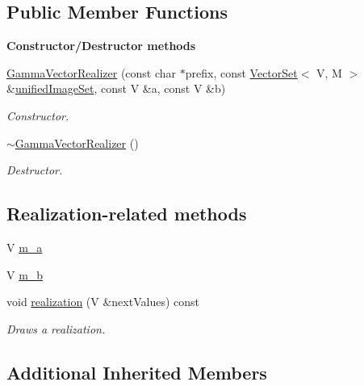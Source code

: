 \subsection*{Public Member Functions}
\begin{Indent}{\bf Constructor/\-Destructor methods}\par
\begin{DoxyCompactItemize}
\item 
\hyperlink{class_q_u_e_s_o_1_1_gamma_vector_realizer_ae6ec0099314ff9d89101c168abfcc9c3}{Gamma\-Vector\-Realizer} (const char $\ast$prefix, const \hyperlink{class_q_u_e_s_o_1_1_vector_set}{Vector\-Set}$<$ V, M $>$ \&\hyperlink{class_q_u_e_s_o_1_1_base_vector_realizer_ad958991bab8d6369e8a0d66b22a237d4}{unified\-Image\-Set}, const V \&a, const V \&b)
\begin{DoxyCompactList}\small\item\em Constructor. \end{DoxyCompactList}\item 
\hyperlink{class_q_u_e_s_o_1_1_gamma_vector_realizer_ac75db6b81ad76b17b1ffccfdd87594d2}{$\sim$\-Gamma\-Vector\-Realizer} ()
\begin{DoxyCompactList}\small\item\em Destructor. \end{DoxyCompactList}\end{DoxyCompactItemize}
\end{Indent}
\subsection*{Realization-\/related methods}
\begin{DoxyCompactItemize}
\item 
V \hyperlink{class_q_u_e_s_o_1_1_gamma_vector_realizer_a536756e884d641240015451f2f7a759c}{m\-\_\-a}
\item 
V \hyperlink{class_q_u_e_s_o_1_1_gamma_vector_realizer_a55e4d4fe511a6d63eaa98d6d6a7aaac5}{m\-\_\-b}
\item 
void \hyperlink{class_q_u_e_s_o_1_1_gamma_vector_realizer_ac2c9be536e210dd61614f96372df8c62}{realization} (V \&next\-Values) const 
\begin{DoxyCompactList}\small\item\em Draws a realization. \end{DoxyCompactList}\end{DoxyCompactItemize}
\subsection*{Additional Inherited Members}



